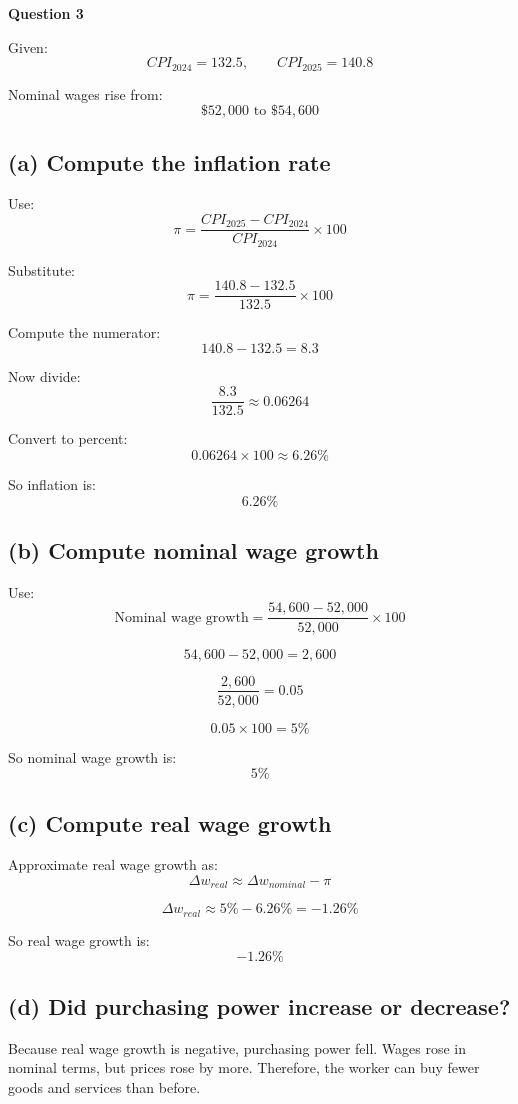 \documentclass[12pt]{article}
\begin{document}
\textbf{Question 3}

Given:
\[
CPI_{2024} = 132.5,\qquad CPI_{2025} = 140.8
\]

Nominal wages rise from:
\[
\$52{,}000 \text{ to } \$54{,}600
\]

\subsection*{(a) Compute the inflation rate}

Use:
\[
\pi = \frac{CPI_{2025} - CPI_{2024}}{CPI_{2024}} \times 100
\]

Substitute:
\[
\pi = \frac{140.8 - 132.5}{132.5} \times 100
\]

Compute the numerator:
\[
140.8 - 132.5 = 8.3
\]

Now divide:
\[
\frac{8.3}{132.5} \approx 0.06264
\]

Convert to percent:
\[
0.06264 \times 100 \approx 6.26\%
\]

So inflation is:
\[
\boxed{6.26\%}
\]

\subsection*{(b) Compute nominal wage growth}

Use:
\[
\text{Nominal wage growth} = \frac{54{,}600 - 52{,}000}{52{,}000} \times 100
\]

\[
54{,}600 - 52{,}000 = 2{,}600
\]

\[
\frac{2{,}600}{52{,}000} = 0.05
\]

\[
0.05 \times 100 = 5\%
\]

So nominal wage growth is:
\[
\boxed{5\%}
\]

\subsection*{(c) Compute real wage growth}

Approximate real wage growth as:
\[
\Delta w_{real} \approx \Delta w_{nominal} - \pi
\]

\[
\Delta w_{real} \approx 5\% - 6.26\% = -1.26\%
\]

So real wage growth is:
\[
\boxed{-1.26\%}
\]

\subsection*{(d) Did purchasing power increase or decrease?}

Because real wage growth is negative, purchasing power fell. Wages rose in nominal terms, but prices rose by more. Therefore, the worker can buy fewer goods and services than before.
\end{document}
